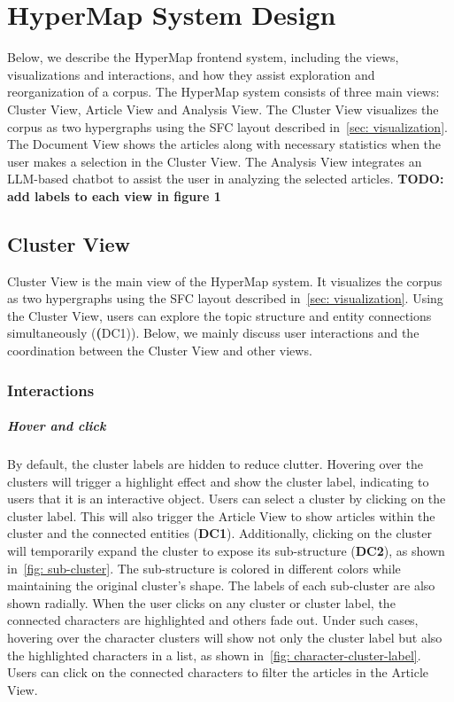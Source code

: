 \section{HyperMap System Design}
Below, we describe the HyperMap frontend system, including the views, visualizations and interactions, and how they assist exploration and reorganization of a corpus.
The HyperMap system consists of three main views: Cluster View, Article View and Analysis View.
The Cluster View visualizes the corpus as two hypergraphs using the SFC layout described in~\autoref{sec: visualization}.
The Document View shows the articles along with necessary statistics when the user makes a selection in the Cluster View.
The Analysis View integrates an LLM-based chatbot to assist the user in analyzing the selected articles. 
\textbf{TODO: add labels to each view in figure 1}
\subsection{Cluster View}
Cluster View is the main view of the HyperMap system.
It visualizes the corpus as two hypergraphs using the SFC layout described in~\autoref{sec: visualization}.
Using the Cluster View, users can explore the topic structure and entity connections simultaneously (\textbf(DC1)).
Below, we mainly discuss user interactions and the coordination between the Cluster View and other views.
\subsubsection{Interactions}
\subparagraph{Hover and click}
By default, the cluster labels are hidden to reduce clutter.
Hovering over the clusters will trigger a highlight effect and show the cluster label, indicating to users that it is an interactive object.
Users can select a cluster by clicking on the cluster label.
This will also trigger the Article View to show articles within the cluster and the connected entities (\textbf{DC1}).
Additionally, clicking on the cluster will temporarily expand the cluster to expose its sub-structure (\textbf{DC2}), as shown in~\autoref{fig: sub-cluster}.
The sub-structure is colored in different colors while maintaining the original cluster's shape.
The labels of each sub-cluster are also shown radially.
When the user clicks on any cluster or cluster label, the connected characters are highlighted and others fade out.
Under such cases, hovering over the character clusters will show not only the cluster label but also the highlighted characters in a list, as shown in~\autoref{fig: character-cluster-label}.
Users can click on the connected characters to filter the articles in the Article View.

